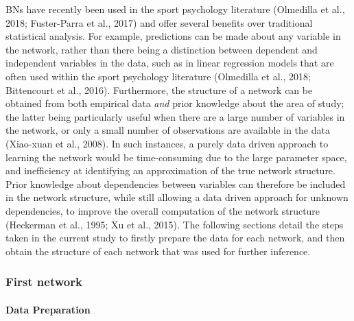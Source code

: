 \documentclass[
  english,
  man]{apa6}
\let\oldparagraph\paragraph
\renewcommand{\paragraph}[1]{\oldparagraph{#1}\mbox{}}
\begin{document}
BNs have recently been used in the sport psychology literature (Olmedilla et al., 2018; Fuster-Parra et al., 2017) and offer several benefits over traditional statistical analysis.
For example, predictions can be made about any variable in the network, rather than there being a distinction between dependent and independent variables in the data, such as in linear regression models that are often used within the sport psychology literature (Olmedilla et al., 2018; Bittencourt et al., 2016).
Furthermore, the structure of a network can be obtained from both empirical data \emph{and} prior knowledge about the area of study; the latter being particularly useful when there are a large number of variables in the network, or only a small number of observations are available in the data (Xiao-xuan et al., 2008).
In such instances, a purely data driven approach to learning the network would be time-consuming due to the large parameter space, and inefficiency at identifying an approximation of the true network structure.
Prior knowledge about dependencies between variables can therefore be included in the network structure, while still allowing a data driven approach for unknown dependencies, to improve the overall computation of the network structure (Heckerman et al., 1995; Xu et al., 2015).
The following sections detail the steps taken in the current study to firstly prepare the data for each network, and then obtain the structure of each network that was used for further inference.

\hypertarget{first-network}{%
\subsubsection{First network}\label{first-network}}

\hypertarget{data-preparation}{%
\paragraph{Data Preparation}\label{data-preparation}}
\end{document}
